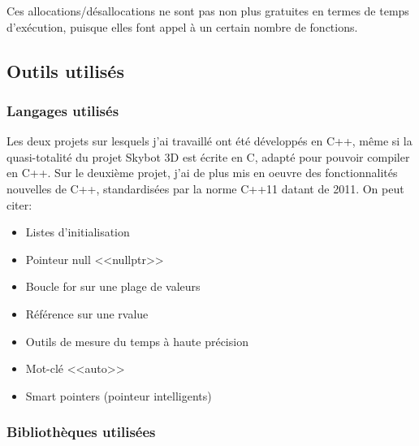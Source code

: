 \documentclass[a4paper,french,12pt]{article}
\begin{document}
	      Ces allocations/désallocations ne sont pas non plus gratuites en termes de temps d'exécution, puisque
	      elles font appel à un certain nombre de fonctions.

	
	\subsection{Outils utilisés}

		\subsubsection{Langages utilisés}
		    Les deux projets sur lesquels j'ai travaillé ont été développés en C++, même si la quasi-totalité 
		    du projet Skybot 3D est écrite en C, adapté pour pouvoir compiler en C++.
		    Sur le deuxième projet, j'ai de plus mis en oeuvre des fonctionnalités nouvelles de C++, standardisées
		    par la norme C++11 datant de 2011. On peut citer:\\
		    
		    \begin{itemize}
		    \item Listes d'initialisation 
		    \item Pointeur null <<nullptr>>
		    \item Boucle for sur une plage de valeurs
		    \item Référence sur une rvalue
		    \item Outils de mesure du temps à haute précision
		    \item Mot-clé <<auto>>
		    \item Smart pointers (pointeur intelligents)
		    \end{itemize}
	
		\subsubsection{Bibliothèques utilisées}
\end{document}
